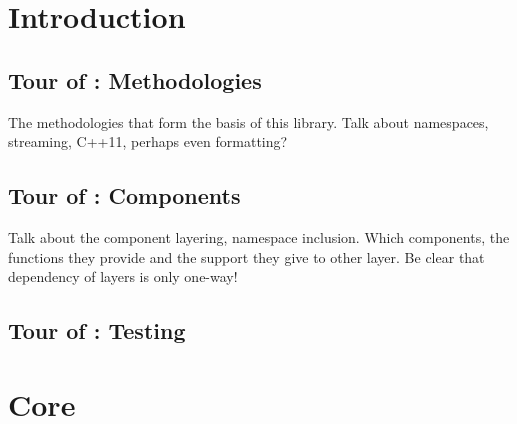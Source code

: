 \documentclass[10pt,a4paper,openany]{mudbook}
\begin{document}

\part{Introduction}


\chapter{Tour of \MUDLib: Methodologies}

The methodologies that form the basis of this library. Talk about namespaces,
streaming, C++11, perhaps even formatting?


\chapter{Tour of \MUDLib: Components}

Talk about the component layering, namespace inclusion. Which components,
the functions they provide and the support they give to other layer. Be clear
that dependency of layers is only one-way!


\chapter{Tour of \MUDLib: Testing}


\part{Core}

\end{document}

